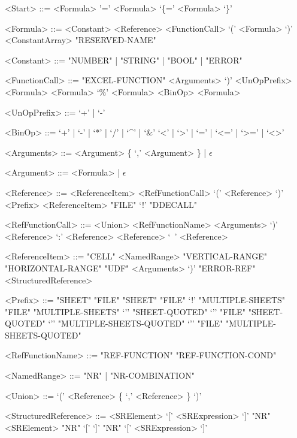 \begin{grammar}
<Start> ::= <Formula>
	\alt '=' <Formula>
	\alt `\{=' <Formula> `\}'

<Formula> ::= <Constant>
         \alt <Reference>
         \alt <FunctionCall>
         \alt `(' <Formula> `)'
         \alt <ConstantArray>
         \alt "RESERVED-NAME"
         
<Constant> ::= "NUMBER" | "STRING" | "BOOL" | "ERROR"
         
<FunctionCall> ::= "EXCEL-FUNCTION" <Arguments> `)'
		\alt <UnOpPrefix> <Formula>
		\alt <Formula> `\%'
		\alt <Formula> <BinOp> <Formula>
		
<UnOpPrefix> ::= `+' | `-'

<BinOp> ::= `+' | `-' | `*' | `/' | `\textasciicircum' | `\&'
	\alt `<' | `>' | `=' | `<=' | `>=' | `<>'

	
<Arguments> ::= <Argument> \{ `,' <Argument> \} | $\epsilon$

<Argument> ::= <Formula> | $\epsilon$

<Reference> ::= <ReferenceItem>
    \alt <RefFunctionCall>
	\alt `(' <Reference> `)' 
	\alt <Prefix> <ReferenceItem>
	\alt "FILE" `!' "DDECALL"

<RefFunctionCall> ::= <Union>
    \alt <RefFunctionName> <Arguments> `)'
    \alt <Reference> `:' <Reference>
	\alt <Reference> `\ ' <Reference>
    
<ReferenceItem> ::= "CELL"
	\alt <NamedRange>
	\alt "VERTICAL-RANGE"
	\alt "HORIZONTAL-RANGE"
	\alt "UDF" <Arguments> `)'
	\alt "ERROR-REF"
	\alt <StructuredReference>
	
<Prefix> ::= "SHEET"
	\alt "FILE" "SHEET"
	\alt "FILE" `!'
	\alt "MULTIPLE-SHEETS"
	\alt "FILE" "MULTIPLE-SHEETS"
	\alt `'' "SHEET-QUOTED"
	\alt `'' "FILE" "SHEET-QUOTED"
	\alt `'' "MULTIPLE-SHEETS-QUOTED"
	\alt `'' "FILE" "MULTIPLE-SHEETS-QUOTED"

<RefFunctionName> ::= "REF-FUNCTION"
			\alt "REF-FUNCTION-COND"
	
<NamedRange> ::= "NR" | "NR-COMBINATION"

<Union> ::= `(' <Reference> \{ `,' <Reference> \} `)'

<StructuredReference> ::= <SRElement>
	\alt `[' <SRExpression> `]'
	\alt "NR" <SRElement>
	\alt "NR" `[' `]'
	\alt "NR" `[' <SRExpression> `]'



\end{grammar}

